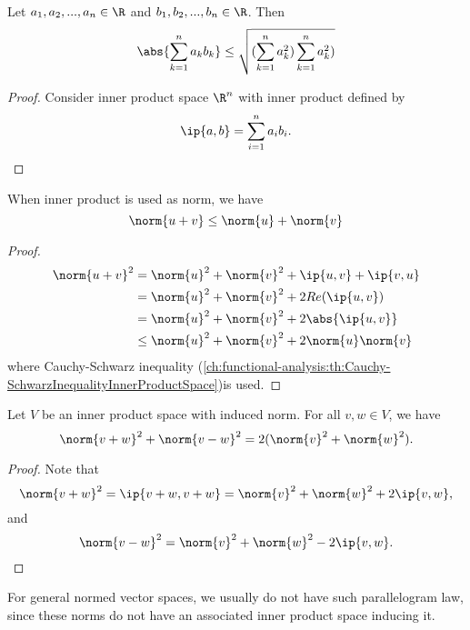 \begin{refsection}
\begin{corollary}\cite[120]{johnsonbaugh2010foundations}\label{ch:functional-analysis:th:Cauchy-SchwarzInequalityFiniteRealTerms} Let $a_1,a_2,...,a_n \in \R$ and $b_1,b_2,...,b_n \in \R$. Then 
	$$\abs{\sum_{k=1}^n a_kb_k} \leq \sqrt{(\sum_{k=1}^n a_k^2)\sum_{k=1}^n a_k^2)}$$
\end{corollary}
\begin{proof}
	Consider inner product space $\R^n$ with inner product defined by 
	$$\ip{a,b} = \sum_{i=1}^n a_ib_i. $$	
\end{proof}

\begin{lemma}\label{ch:functional-analysis:th:innerProductAsInducedNorm}\cite[290]{johnsonbaugh2010foundations}
	\cite[172]{axler2015linear} When inner product is used as norm, we have
	$$\norm{u + v} \leq \norm{u} + \norm{v}$$
\end{lemma}
\begin{proof}
	\begin{align*}
	\norm{u+v}^2 & = \norm{u}^2 + \norm{v}^2 + \ip{u,v} + \ip{v,u} \\
	& = \norm{u}^2 + \norm{v}^2 + 2Re(\ip{u,v})\\
	& = \norm{u}^2 + \norm{v}^2 + 2\abs{\ip{u,v}}\\
	& \leq \norm{u}^2 + \norm{v}^2 + 2\norm{u}\norm{v}
	\end{align*}
	where Cauchy-Schwarz inequality (\autoref{ch:functional-analysis:th:Cauchy-SchwarzInequalityInnerProductSpace})is used. 	
\end{proof}

\begin{lemma}\cite[64]{christensen2010functions}\label{ch:functional-analysis:th:InnerProductSpaceParallelogramLaw}
	Let $V$ be an inner product space with induced norm. For all $v,w\in V$, we have
	$$\norm{v+w}^2 + \norm{v-w}^2 = 2(\norm{v}^2 + \norm{w}^2).$$
\end{lemma}
\begin{proof}
Note that
$$\norm{v+w}^2 = \ip{v+w,v+w} = \norm{v}^2 + \norm{w}^2 + 2\ip{v,w},$$
and
$$\norm{v-w}^2 = \norm{v}^2 + \norm{w}^2 - 2\ip{v,w}.$$	
\end{proof}

\begin{remark}[caution!]
For general normed vector spaces, we usually do not have such parallelogram law, since these norms do not have an associated inner product space inducing it. 	
\end{remark}



\end{refsection}

